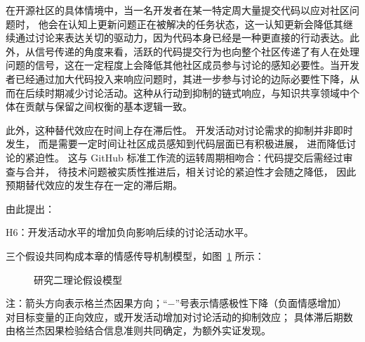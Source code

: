 \documentclass[
    type = master, %
    degree = professional,        %
    decl-page,  %
    twoside,                %
    fontset = fandol %
  ]{njuthesis}
\begin{document}
在开源社区的具体情境中，当一名开发者在某一特定周大量提交代码以应对社区问题时，
他会在认知上更新问题正在被解决的任务状态，这一认知更新会降低其继续通过讨论来表达关切的驱动力，因为代码本身已经是一种更直接的行动表达。此外，从信号传递的角度来看，活跃的代码提交行为也向整个社区传递了有人在处理问题的信号，这在一定程度上会降低其他社区成员参与讨论的感知必要性。当开发者已经通过加大代码投入来响应问题时，其进一步参与讨论的边际必要性下降，从而在后续时期减少讨论活动。这种从行动到抑制的链式响应，与知识共享领域中个体在贡献与保留之间权衡的基本逻辑一致\cite{lu2018sharing}。

此外，这种替代效应在时间上存在滞后性。
开发活动对讨论需求的抑制并非即时发生，
而是需要一定时间让社区成员感知到代码层面已有积极进展，
进而降低讨论的紧迫性。
这与 GitHub 标准工作流的运转周期相吻合：代码提交后需经过审查与合并，
待技术问题被实质性推进后，相关讨论的紧迫性才会随之降低，
因此预期替代效应的发生存在一定的滞后期。

由此提出：

H6：开发活动水平的增加负向影响后续的讨论活动水平。

三个假设共同构成本章的情感传导机制模型，如图~\ref{fig:path-model-2} 所示：

\begin{figure}[htbp]
    \centering
    \caption{研究二理论假设模型}
    \label{fig:path-model-2}
\end{figure}

注：箭头方向表示格兰杰因果方向；“$-$”号表示情感极性下降（负面情感增加）
对目标变量的正向效应，或开发活动增加对讨论活动的抑制效应；
具体滞后期数由格兰杰因果检验结合信息准则共同确定，为额外实证发现。
\end{document}
